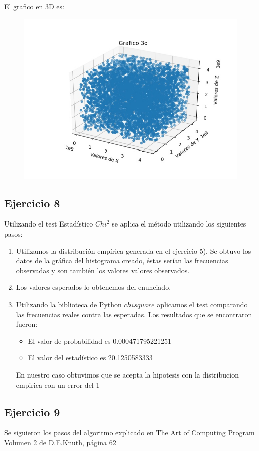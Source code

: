 \documentclass[11pt,a4paper]{article}
\begin{document}
		El grafico en 3D es:
		\begin{figure}[H]
  			\centering
    			\includegraphics[width=14cm]{imagenes/histogramaEjer73d}
		\end{figure}

	\subsection{Ejercicio 8}
	Utilizando el test Estadístico $Chi^2$ se aplica el método utilizando los siguientes pasos:
	\begin{enumerate}
		\item Utilizamos la distribución empírica generada en el ejercicio 5). Se obtuvo los datos de la gráfica del histograma creado, éstas serían las frecuencias observadas y son también los valores valores observados.
		\item Los valores esperados lo obtenemos del enunciado.
		\item Utilizando la biblioteca de Python $chisquare$ aplicamos el test comparando las frecuencias reales contra las esperadas.
		Los resultados que se encontraron fueron:
		\begin{itemize}
			\item El valor de probabilidad es 0.000471795221251
			\item El valor del estadístico es 20.1250583333
		\end{itemize}
		En nuestro caso obtuvimos que se acepta la hipotesis con la distribucion empirica con un error del 1%
	\end{enumerate}

	\subsection{Ejercicio 9}
	Se siguieron los pasos del algoritmo explicado en The Art of Computing Program Volumen 2 de D.E.Knuth, página 62
\end{document}
